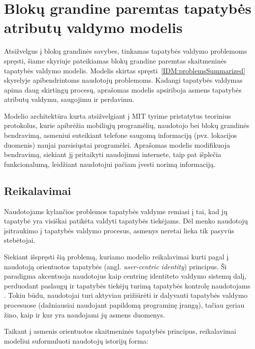 \section{Blokų grandine paremtas tapatybės atributų valdymo modelis} \label{section:BCIDM}

Atsižvelgus į blokų grandinės savybes, tinkamas tapatybės valdymo problemoms spręsti, šiame skyriuje pateikiamas
blokų grandine paremtas skaitmeninės tapatybės valdymo modelis. Modelis skirtas spręsti\hypertarget{IDM:problemsSummarized}{~\ref{IDM:problemsSummarized}} skyrelyje
apibendrintoms naudotojų problemoms. Kadangi tapatybės valdymas apima
daug skirtingų procesų, aprašomas modelis apsiriboja asmens tapatybės atributų valdymu, saugojimu ir perdavimu.

Modelio architektūra kurta atsižvelgiant į MIT tyrime \cite{MITPaper} pristatytus teorinius protokolus, kurie apibrėžia
mobiliųjų programėlių, naudotojo bei blokų grandinės bendravimą, asmeniui suteikiant telefone saugomą
informaciją (pvz. lokacijos duomenis) naujai parsisiųstai programėlei. Aprašomas modelis modifikuoja bendravimą, siekiant 
jį pritaikyti naudojimui internete, taip pat išplečia funkcionalumą, leidžiant naudotojui pačiam įvesti norimą informaciją.

\subsection{Reikalavimai} \label{BCIDM:requirements}

Naudotojams kylančios problemos tapatybės valdyme remiasi į tai, kad jų tapatybė yra
visiškai patikėta valdyti tapatybės tiekėjams. Dėl menko naudotojų įsitraukimo į tapatybės valdymo
procesus, asmenys neretai lieka tik pasyvūs stebėtojai.

Siekiant išspręsti šią problemą, kuriamo modelio reikalavimai kurti pagal į naudotoją orientuotos tapatybės
(angl. \textit{user-centric identity}) principus. Ši paradigma akcentuoja naudotojus kaip centrinę
identiteto valdymo sistemų dalį, perduodant paslaugų ir tapatybės tiekėjų turimą tapatybės kontrolę
naudotojams \cite{Cao2010}. Tokiu būdu, naudotojai turi aktyviau prižiūrėti ir dalyvauti tapatybės
valdymo procesuose (dažniausiai naudojant papildomą programinę įrangą),
tačiau geriau žino, kaip ir kur yra naudojami jų asmens duomenys.

Taikant į asmenis orientuotos skaitmeninės tapatybės principus, reikalavimai modeliui suformuluoti naudotojų istorijų forma:

